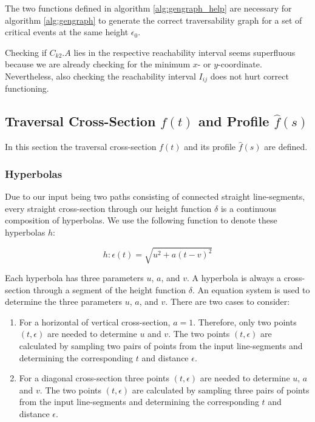 The two functions defined in algorithm \ref{alg:gengraph_help} are necessary for algorithm \ref{alg:gengraph} to generate the correct traversability graph for a set of critical events at the same height $\epsilon_0$.

Checking if $C_{k2}.A$ lies in the respective reachability interval seems superfluous because we are already checking for the minimum $x$- or $y$-coordinate. Nevertheless, also checking the reachability interval $I_{ij}$ does not hurt correct functioning.


\subsection{Traversal Cross-Section $f(t)$ and Profile $\hat{f}(s)$}\label{sec:trav_csp}

In this section the traversal cross-section $f(t)$ and its profile $\hat{f}(s)$ are defined.

\subsubsection{Hyperbolas}

Due to our input being two paths consisting of connected straight line-segments, every straight cross-section through our height function $\delta$ is a continuous composition of hyperbolas. We use the following function to denote these hyperbolas $h$:

$$h: \epsilon(t) = \sqrt{u^2 + a(t - v)^2}$$

Each hyperbola has three parameters $u$, $a$, and $v$. A hyperbola is always a cross-section through a segment of the height function $\delta$. An equation system is used to determine the three parameters $u$, $a$, and $v$. There are two cases to consider:

\begin{enumerate}
	\item For a horizontal of vertical cross-section, $a = 1$. Therefore, only two points $(t, \epsilon)$ are needed to determine $u$ and $v$. The two points $(t, \epsilon)$ are calculated by sampling two pairs of points from the input line-segments and determining the corresponding $t$ and distance $\epsilon$.
	\item For a diagonal cross-section three points $(t, \epsilon)$ are needed to determine $u$, $a$ and $v$. The two points $(t, \epsilon)$ are calculated by sampling three pairs of points from the input line-segments and determining the corresponding $t$ and distance $\epsilon$.
\end{enumerate}


